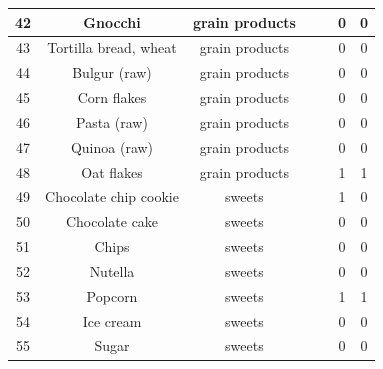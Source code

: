 \documentclass[
  letterpaper,
  DIV=11,
  numbers=noendperiod]{scrartcl}
\begin{document}
\begin{tabular}[t]{c|c|c|>{}c|>{}c|c|c}
\hline
42 & Gnocchi & grain products & \cellcolor[HTML]{450559}{\textcolor{white}{600}} & \cellcolor[HTML]{423F85}{\textcolor{white}{150}} & 0 & 0\\
\hline
43 & Tortilla bread, wheat & grain products & \cellcolor[HTML]{46075A}{\textcolor{white}{740}} & \cellcolor[HTML]{2A778E}{\textcolor{white}{304}} & 0 & 0\\
\hline
44 & Bulgur (raw) & grain products & \cellcolor[HTML]{450457}{\textcolor{white}{560}} & \cellcolor[HTML]{297B8E}{\textcolor{white}{314}} & 0 & 0\\
\hline
45 & Corn flakes & grain products & \cellcolor[HTML]{471164}{\textcolor{white}{1510}} & \cellcolor[HTML]{21918C}{\textcolor{white}{379}} & 0 & 0\\
\hline
46 & Pasta (raw) & grain products & \cellcolor[HTML]{471164}{\textcolor{white}{1460}} & \cellcolor[HTML]{27808E}{\textcolor{white}{330}} & 0 & 0\\
\hline
47 & Quinoa (raw) & grain products & \cellcolor[HTML]{470E61}{\textcolor{white}{1300}} & \cellcolor[HTML]{228C8D}{\textcolor{white}{366}} & 0 & 0\\
\hline
48 & Oat flakes & grain products & \cellcolor[HTML]{450559}{\textcolor{white}{670}} & \cellcolor[HTML]{218E8D}{\textcolor{white}{372}} & 1 & 1\\
\hline
49 & Chocolate chip cookie & sweets & \cellcolor[HTML]{482173}{\textcolor{white}{2730}} & \cellcolor[HTML]{1FA287}{\textcolor{white}{434}} & 1 & 0\\
\hline
50 & Chocolate cake & sweets & \cellcolor[HTML]{481D6F}{\textcolor{white}{2360}} & \cellcolor[HTML]{238A8D}{\textcolor{white}{360}} & 0 & 0\\
\hline
51 & Chips & sweets & \cellcolor[HTML]{482979}{\textcolor{white}{3290}} & \cellcolor[HTML]{37B878}{\textcolor{white}{503}} & 0 & 0\\
\hline
52 & Nutella & sweets & \cellcolor[HTML]{46307E}{\textcolor{white}{3970}} & \cellcolor[HTML]{4EC36B}{\textcolor{white}{539}} & 0 & 0\\
\hline
53 & Popcorn & sweets & \cellcolor[HTML]{470D60}{\textcolor{white}{1100}} & \cellcolor[HTML]{1F988B}{\textcolor{white}{403}} & 1 & 1\\
\hline
54 & Ice cream & sweets & \cellcolor[HTML]{482979}{\textcolor{white}{3310}} & \cellcolor[HTML]{414487}{\textcolor{white}{160}} & 0 & 0\\
\hline
55 & Sugar & sweets & \cellcolor[HTML]{460B5E}{\textcolor{white}{1030}} & \cellcolor[HTML]{1F998A}{\textcolor{white}{405}} & 0 & 0\\

\end{tabular}
\end{document}
